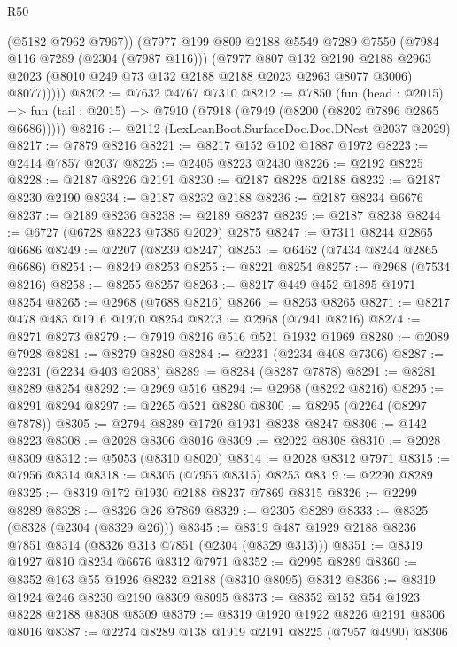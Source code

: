 \begin{lexlean}{R50}
\begin{coremodule}
            (@5182 @7962 @7967))
          (@7977
            @199
            @809
            @2188
            @5549
            @7289
            @7550
            (@7984 @116 @7289 (@2304 (@7987 @116)))
            (@7977
              @807
              @132
              @2190
              @2188
              @2963
              @2023
              (@8010 @249 @73 @132 @2188 @2188 @2023 @2963 @8077 @3006)
              @8077)))))
@8202 := @7632 @4767 @7310
@8212 := @7850
    (fun (head : @2015) =>
    fun (tail : @2015) => @7910 (@7918 (@7949 (@8200 (@8202 @7896 @2865 @6686)))))
@8216 := @2112 (LexLeanBoot.SurfaceDoc.Doc.DNest @2037 @2029)
@8217 := @7879 @8216
@8221 := @8217 @152 @102 @1887 @1972
@8223 := @2414 @7857 @2037
@8225 := @2405 @8223 @2430
@8226 := @2192 @8225
@8228 := @2187 @8226 @2191
@8230 := @2187 @8228 @2188
@8232 := @2187 @8230 @2190
@8234 := @2187 @8232 @2188
@8236 := @2187 @8234 @6676
@8237 := @2189 @8236
@8238 := @2189 @8237
@8239 := @2187 @8238
@8244 := @6727 (@6728 @8223 @7386 @2029) @2875
@8247 := @7311 @8244 @2865 @6686
@8249 := @2207 (@8239 @8247)
@8253 := @6462 (@7434 @8244 @2865 @6686)
@8254 := @8249 @8253
@8255 := @8221 @8254
@8257 := @2968 (@7534 @8216)
@8258 := @8255 @8257
@8263 := @8217 @449 @452 @1895 @1971 @8254
@8265 := @2968 (@7688 @8216)
@8266 := @8263 @8265
@8271 := @8217 @478 @483 @1916 @1970 @8254
@8273 := @2968 (@7941 @8216)
@8274 := @8271 @8273
@8279 := @7919 @8216 @516 @521 @1932 @1969
@8280 := @2089 @7928
@8281 := @8279 @8280
@8284 := @2231 (@2234 @408 @7306)
@8287 := @2231 (@2234 @403 @2088)
@8289 := @8284 (@8287 @7878)
@8291 := @8281 @8289 @8254
@8292 := @2969 @516
@8294 := @2968 (@8292 @8216)
@8295 := @8291 @8294
@8297 := @2265 @521 @8280
@8300 := @8295 (@2264 (@8297 @7878))
@8305 := @2794 @8289 @1720 @1931 @8238 @8247
@8306 := @142 @8223
@8308 := @2028 @8306 @8016
@8309 := @2022 @8308
@8310 := @2028 @8309
@8312 := @5053 (@8310 @8020)
@8314 := @2028 @8312 @7971
@8315 := @7956 @8314
@8318 := @8305 (@7955 @8315) @8253
@8319 := @2290 @8289
@8325 := @8319 @172 @1930 @2188 @8237 @7869 @8315
@8326 := @2299 @8289
@8328 := @8326 @26 @7869
@8329 := @2305 @8289
@8333 := @8325 (@8328 (@2304 (@8329 @26)))
@8345 := @8319 @487 @1929 @2188 @8236 @7851 @8314 (@8326 @313 @7851 (@2304 (@8329 @313)))
@8351 := @8319 @1927 @810 @8234 @6676 @8312 @7971
@8352 := @2995 @8289
@8360 := @8352 @163 @55 @1926 @8232 @2188 (@8310 @8095) @8312
@8366 := @8319 @1924 @246 @8230 @2190 @8309 @8095
@8373 := @8352 @152 @54 @1923 @8228 @2188 @8308 @8309
@8379 := @8319 @1920 @1922 @8226 @2191 @8306 @8016
@8387 := @2274 @8289 @138 @1919 @2191 @8225 (@7957 @4990) @8306

\end{coremodule}
\end{lexlean}
